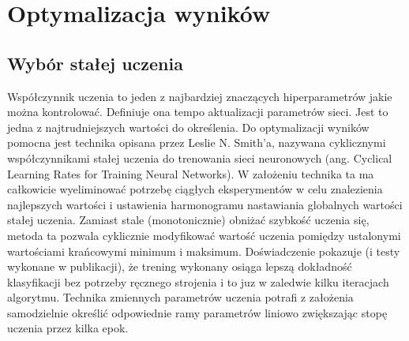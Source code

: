 \documentclass[12pt,a4paper,twoside,titlepage,openright]{book}
\begin{document}
\section{Optymalizacja wyników}
\subsection{Wybór stałej uczenia}
Współczynnik uczenia to jeden z najbardziej znaczących hiperparametrów jakie można kontrolować. Definiuje ona tempo aktualizacji parametrów sieci. Jest to jedna z najtrudniejszych wartości do określenia. Do optymalizacji wyników pomocna jest technika opisana przez Leslie N. Smith’a, nazywana cyklicznymi współczynnikami stałej uczenia do trenowania sieci neuronowych (ang. Cyclical Learning Rates for Training Neural Networks). W założeniu technika ta ma całkowicie wyeliminować potrzebę ciągłych eksperymentów w celu znalezienia najlepszych wartości i ustawienia harmonogramu nastawiania globalnych wartości stałej uczenia. Zamiast stale (monotonicznie) obniżać szybkość uczenia się, metoda ta pozwala cyklicznie modyfikować wartość uczenia pomiędzy ustalonymi wartościami krańcowymi minimum i maksimum. Doświadczenie pokazuje (i testy wykonane w publikacji), że trening wykonany osiąga lepszą dokładność klasyfikacji bez potrzeby ręcznego strojenia i to juz w zaledwie kilku iteracjach algorytmu. Technika zmiennych parametrów uczenia potrafi z założenia samodzielnie określić odpowiednie ramy parametrów liniowo zwiększając stopę uczenia przez kilka epok.\cite{DBLP:journals/corr/Smith15a}
\end{document}
